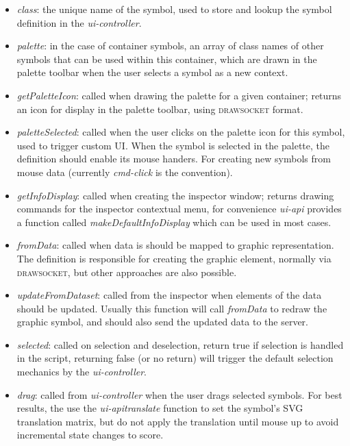 \documentclass{article}
\def\drawsocket{\textsc{drawsocket}\xspace}
\def\uicontroller{\textit{ui-controller}\xspace}
\def\uiapi{\textit{ui-api}\xspace}
\begin{document}
\begin{itemize}\itemsep0pt 
\item \textit{class}: the unique name of the symbol, used to store and lookup the symbol definition in the \uicontroller.

\item \textit{palette}: in the case of container symbols, an array of class names of other symbols that can be used within this container, which are drawn in the palette toolbar when the user selects a symbol as a new context.

\item \textit{getPaletteIcon}: called when drawing the palette for a given container; returns an icon for display in the palette toolbar, using \drawsocket format.

\item \textit{paletteSelected}: called when the user clicks on the palette icon for this symbol, used to trigger custom UI. When the symbol is selected in the palette, the definition should enable its mouse handers. For creating new symbols from mouse data (currently \textit{cmd-click} is the convention).

\item \textit{getInfoDisplay}: called when creating the inspector window; returns drawing commands for the inspector contextual menu, for convenience \uiapi provides a function called \textit{makeDefaultInfoDisplay} which can be used in most cases.

\item \textit{fromData}: called when data is should be mapped to graphic representation. The definition is responsible for creating the graphic element, normally via \drawsocket, but other approaches are also possible.

\item \textit{updateFromDataset}: called from the inspector when elements of the data should be updated. Usually this function will call \textit{fromData} to redraw the graphic symbol, and should also send the updated data to the server.

\item \textit{selected}: called on selection and deselection, return true if selection is handled in the script, returning false (or no return) will trigger the default selection mechanics by the \uicontroller.

\item \textit{drag}: called from \uicontroller when the user drags selected symbols. For best results, the use the \uiapi \textit{translate} function to set the symbol's SVG translation matrix, but do not apply the translation until mouse up to avoid incremental state changes to score.


\end{itemize}
\end{document}
